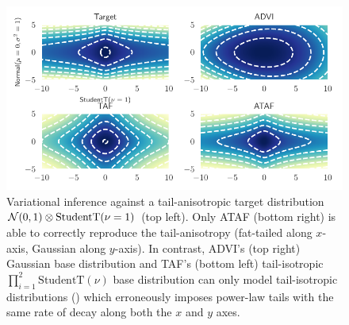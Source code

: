 \documentclass{article}
\theoremstyle{definition}
\theoremstyle{remark}
\begin{document}
\begin{figure}[htbp]
  \centering
  \includegraphics{../Figures/pancake.pdf}
    \vspace{-3mm}
  \caption{
    Variational inference against a tail-anisotropic target distribution $\mathcal{N}(0,1) \otimes \text{StudentT}(\nu=1)$ (top left).
    Only ATAF (bottom right) is able to correctly reproduce the tail-anisotropy (fat-tailed along $x$-axis,
    Gaussian along $y$-axis).
    In contrast, ADVI's (top right) Gaussian base distribution and TAF's (bottom left) tail-isotropic $\prod_{i=1}^2 \text{StudentT}(\nu)$
    base distribution  can only model tail-isotropic distributions ()
    which erroneously imposes power-law tails with the same rate of decay along both the $x$ and $y$ axes.
    \vspace{-5mm}
  }
  \label{fig:pancake}
\end{figure}
\end{document}
